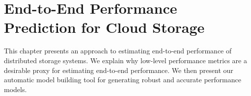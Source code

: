\chapter{End-to-End Performance Prediction for Cloud Storage}
\label{chapter:inside-out}

This chapter presents an approach to estimating end-to-end performance
of distributed storage systems.
We explain why low-level performance metrics are a desirable proxy
for estimating end-to-end performance.
We then present our automatic model building tool for generating
robust and accurate performance models.





%

